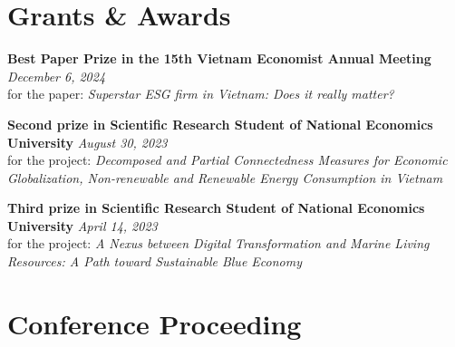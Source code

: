 \documentclass[10.5pt]{article}
\begin{document}

\section{Grants \& Awards}

\textbf{Best Paper Prize in the 15th Vietnam Economist Annual Meeting }\hfill \emph{December 6, 2024}\\
for the paper: \textit{Superstar ESG firm in Vietnam: Does it really matter?}

\textbf{Second prize in Scientific Research Student of National Economics University }\hfill \emph{August 30, 2023}\\
for the project: \textit{Decomposed and Partial Connectedness Measures for Economic Globalization, Non-renewable and Renewable Energy Consumption in Vietnam}

\textbf{Third prize in Scientific Research Student of National Economics University }\hfill \emph{April 14, 2023}\\
for the project: \textit{A Nexus between Digital Transformation and Marine Living Resources: A Path toward Sustainable Blue Economy}

\section{Conference Proceeding}
\end{document}
